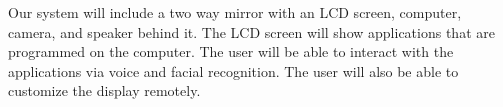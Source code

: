 Our system will include a two way mirror with an LCD screen, computer, camera, and speaker behind it. The LCD screen will show applications that are programmed on the computer. The user will be able to interact with the applications via voice and facial recognition. The user will also be able to customize the display remotely.